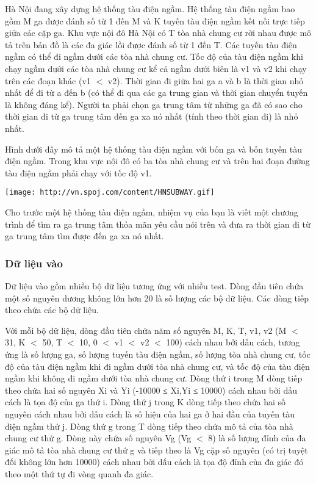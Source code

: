 







   Hà Nội đang xây dựng hệ thống tàu điện ngầm. Hệ thống tàu điện ngầm bao gồm M ga được đánh số từ 1 đến M và K tuyến tàu điện ngầm kết nối trực tiếp giữa các cặp ga. Khu vực nội đô Hà Nội có T tòa nhà chung cư rời nhau được mô tả trên bản đồ là các đa giác lồi được đánh số từ 1 đến T. Các tuyến tàu điện ngầm có thể đi ngầm dưới các tòa nhà chung cư.  Tốc độ của tàu điện ngầm khi chạy ngầm dưới các tòa nhà chung cư kể cả ngầm dưới biên là v1 và v2 khi chạy trên các đoạn khác (v1 $<$ v2). Thời gian đi giữa hai ga a và b là thời gian nhỏ nhất để đi từ a đến b (có thể đi qua các ga trung gian và thời gian chuyển tuyến là không đáng kể). Người ta phải chọn ga trung tâm từ những ga đã có sao cho thời gian đi từ ga trung tâm đến ga xa nó nhất (tính theo thời gian đi) là nhỏ nhất.  

   Hình dưới đây mô tả một hệ thống tàu điện ngầm với bốn ga và bốn tuyến tàu điện ngầm. Trong khu vực nội đô có ba tòa nhà chung cư và trên hai đoạn đường tàu điện ngầm phải chạy với tốc độ v1.  


\texttt{[image: http://vn.spoj.com/content/HNSUBWAY.gif]}

   Cho trước một hệ thống tàu điện ngầm, nhiệm vụ của bạn là viết một chương trình để tìm ra ga trung tâm thỏa mãn yêu cầu nói trên và đưa ra thời gian đi từ ga trung tâm tìm được đến ga xa nó nhất.  

\subsubsection{   Dữ liệu vào  }

   Dữ liệu vào gồm nhiều bộ dữ liệu tương ứng với nhiều test. Dòng đầu tiên chứa một số nguyên dương không lớn hơn 20 là số lượng các bộ dữ liệu. Các dòng tiếp theo chứa các bộ dữ liệu.  

   Với mỗi bộ dữ liệu, dòng đầu tiên chứa năm số nguyên M, K, T, v1, v2 (M $<$ 31, K $<$ 50, T $<$ 10, 0 $<$ v1 $<$ v2 $<$ 100) cách nhau bởi dấu cách, tương ứng là số lượng ga, số lượng tuyến tàu điện ngầm, số lượng tòa nhà chung cư, tốc độ của tàu điện ngầm khi đi ngầm dưới tòa nhà chung cư, và tốc độ của tàu điện ngầm khi không đi ngầm dưới tòa nhà chung cư. Dòng thứ i trong M dòng tiếp theo chứa hai số nguyên Xi và Yi (-10000 ≤ Xi,Yi ≤ 10000) cách nhau bởi dấu cách là tọa độ của ga thứ i. Dòng thứ j trong K dòng tiếp theo chứa hai số nguyên cách nhau bởi dấu cách là số hiệu của hai ga ở hai đầu của tuyến tàu điện ngầm thứ j. Dòng thứ g trong T dòng tiếp theo chứa mô tả của tòa nhà chung cư thứ g. Dòng này chứa số nguyên Vg (Vg $<$ 8) là số lượng đỉnh của đa giác mô tả tòa nhà chung cư thứ g và tiếp theo là Vg cặp số nguyên (có trị tuyệt đối không lớn hơn 10000) cách nhau bởi dấu cách là tọa độ đỉnh của đa giác đó theo một thứ tự đi vòng quanh đa giác.  

